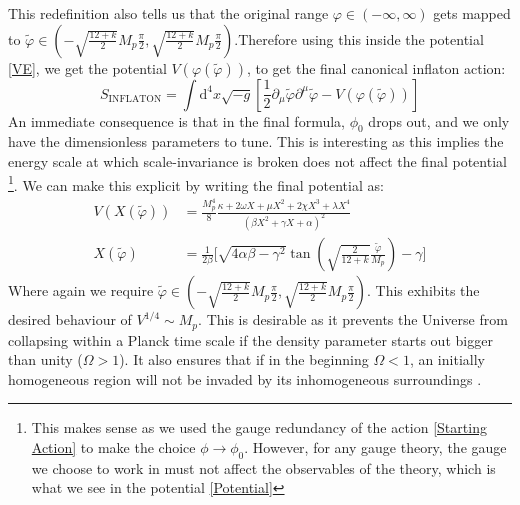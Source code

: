 \documentclass[aps,prd,reprint,preprintnumbers,showpacs,floatfix,nofootinbib,superscript address]{revtex4-2}
\begin{document}
This redefinition also tells us that the original range $\varphi \in (-\infty,\infty)$ gets mapped to $\tilde{\varphi} \in \left( -\sqrt{\frac{12 + k}{2}}M_p \frac{\pi}{2},\sqrt{\frac{12 + k}{2}}M_p \frac{\pi}{2} \right)$.Therefore using this inside the potential \ref{VE}, we get the potential $V(\varphi(\tilde{\varphi}))$, to get the final canonical inflaton action:
\begin{equation}
    S_{\text{INFLATON}} = \int \text{d}^4x \sqrt{-g} \left[ \frac{1}{2}\partial_\mu \tilde{\varphi}\partial^\mu \tilde{\varphi} - V(\varphi(\tilde{\varphi})) \right]
\end{equation}
An immediate consequence is that in the final formula, $\phi_0$ drops out, and we only have the dimensionless parameters to tune. This is interesting as this implies the energy scale at which scale-invariance is broken does not affect the final potential \footnote{This makes sense as we used the gauge redundancy of the action \ref{Starting Action} to make the choice $\phi \rightarrow \phi_0$. However, for any gauge theory, the gauge we choose to work in must not affect the observables of the theory, which is what we see in the potential \ref{Potential}}. We can make this explicit by writing the final potential as:
\begin{align}
    V(X(\tilde{\varphi})) &=  \frac{M_p^4}{8}  \frac{ \kappa + 2\omega X +\mu X^2 + 2\chi X^3 + \lambda X^4 }{(\beta X^2 + \gamma X + \alpha )^2} \label{Potential} \\
    X(\tilde{\varphi}) &= \frac{1}{2\beta} \Biggl[ \sqrt{4\alpha\beta - \gamma^2} \tan\left(\sqrt{\frac{2}{12+k}}\frac{\tilde{\varphi}}{M_p}\right) - \gamma \Biggr]  \label{X}
\end{align}
Where again we require $\tilde{\varphi} \in \left( -\sqrt{\frac{12 + k}{2}}M_p \frac{\pi}{2},\sqrt{\frac{12 + k}{2}}M_p \frac{\pi}{2} \right)$. This exhibits the desired behaviour of $V^{1/4} \sim M_p$. This is desirable as it prevents the Universe from collapsing within a Planck time scale if the density parameter starts out bigger than unity ($\Omega > 1$). It also ensures that if in the beginning $\Omega < 1$, an initially homogeneous region will not be invaded by its inhomogeneous surroundings \cite{Liddle_Lyth_2000}.  
\end{document}
